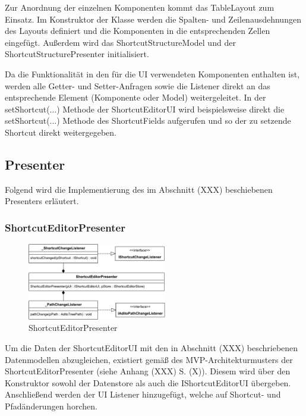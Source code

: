 \vspace{-12px}

Zur Anordnung der einzelnen Komponenten kommt das TableLayout zum Einsatz. Im Konstruktor der Klasse werden die Spalten- und Zeilenausdehnungen des Layouts definiert und die Komponenten in die entsprechenden Zellen eingefügt. Außerdem wird das ShortcutStructureModel und der ShortcutStructurePresenter initialisiert. 

Da die Funktionalität in den für die UI verwendeten Komponenten enthalten ist, werden alle Getter- und Setter-Anfragen sowie die Listener direkt an das entsprechende Element (Komponente oder Model) weitergeleitet. In der setShortcut(...) Methode der ShortcutEditorUI wird beispielsweise direkt die setShortcut(...) Methode des ShortcutFields aufgerufen und so der zu setzende Shortcut direkt weitergegeben.

\newpage

\subsection{Presenter}

Folgend wird die Implementierung des im Abschnitt (XXX) beschiebenen Presenters erläutert.

\subsubsection{ShortcutEditorPresenter}

\begin{figure}
	\centering
	\includegraphics[width=230px]{../graphic/diagrams/CD_ShortcutEditorPresenter/ShortcutEditorPresenter}
	\caption{ShortcutEditorPresenter}
	\label{fig:shortcuteditorpresenter}
\end{figure}

Um die Daten der ShortcutEditorUI mit den in Abschnitt (XXX) beschriebenen Datenmodellen abzugleichen, existiert gemäß des MVP-Architekturmusters der ShortcutEditorPresenter (siehe Anhang (XXX) S. (X)). Diesem wird über den Konstruktor sowohl der Datenstore als auch die IShortcutEditorUI übergeben. Anschließend werden der UI Listener hinzugefügt, welche auf Shortcut- und Pfadänderungen horchen.

